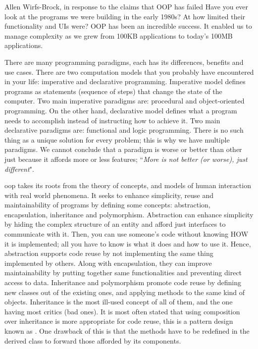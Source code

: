 \documentclass[12pt]{book}
\begin{document}
\begin{kodequote}{Allen Wirfs-Brock, in response to the claims that OOP has failed}
	Have you ever look at the programs we were building in the early 1980s? At how limited their functionality and UIs were? OOP has been an incredible success. It enabled us to manage complexity as we grew from 100KB applications to today’s 100MB applications.
\end{kodequote}

\begin{discussion}

There are many programming paradigms, each has its differences, benefits and use cases. 
There are two computation models that you probably have encountered in your life: imperative and declarative programming. 
Imperative model defines programs as statements (sequence of steps) that change the state of the computer. 
Two main imperative paradigms are: procedural and object-oriented programming. 
On the other hand, declarative model defines what a program needs to accomplish instead of instructing how to achieve it. 
Two main declarative paradigms are: functional and logic programming.
There is no such thing as a unique solution for every problem; this is why we have multiple paradigms. 
We cannot conclude that a paradigm is worse or better than other just because it affords more or less features; ``\textit{More is not better (or worse), just different}"\citep{2004-vanroy-haridi}.

\ac{oop} takes its roots from the theory of concepts, and models of human interaction with real world phenomena. 
It seeks to enhance simplicity, reuse and maintainability of programs by defining some concepts: abstraction, encapsulation, inheritance and polymorphism.
Abstraction can enhance simplicity by hiding the complex structure of an entity and afford just interfaces to communicate with it. 
Then, you can use someone's code without knowing HOW it is implemented; all you have to know is what it does and how to use it. 
Hence, abstraction supports code reuse by not implementing the same thing implemented by others. 
Along with encapsulation, they can improve maintainability by putting together same functionalities and preventing direct access to data. 
Inheritance and polymorphism promote code reuse by defining new classes out of the existing ones, and applying methods to the same kind of objects. 
Inheritance is the most ill-used concept of all of them, and the one having most critics (bad ones). 
It is most often stated that using composition over inheritance is more appropriate for code reuse, this is a pattern design known as  \citep{2002-knoernschild}.
One drawback of this is that the methods have to be redefined in the derived class to forward those afforded by its components.

\end{discussion}


\ifx\wholebook\relax\else
% 
% 
	
\end{document}
